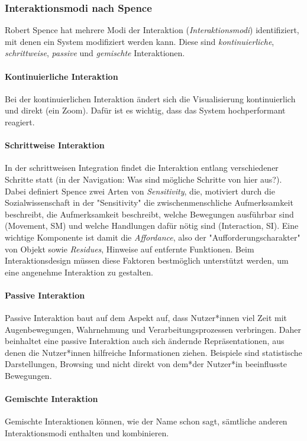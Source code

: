 			\subsubsection{Interaktionsmodi nach Spence}
				Robert Spence hat mehrere Modi der Interaktion (\emph{Interaktionsmodi}) identifiziert, mit denen ein System modifiziert werden kann. Diese sind \emph{kontinuierliche}, \emph{schrittweise}, \emph{passive} und \emph{gemischte} Interaktionen.

				\paragraph{Kontinuierliche Interaktion}
					Bei der kontinuierlichen Interaktion ändert sich die Visualisierung kontinuierlich und direkt (\bspw ein Zoom). Dafür ist es wichtig, dass das System hochperformant reagiert.

				\paragraph{Schrittweise Interaktion}
					In der schrittweisen Integration findet die Interaktion entlang verschiedener Schritte statt (\zB in der Navigation: Was sind mögliche Schritte von hier aus?). Dabei definiert Spence zwei Arten von \emph{Sensitivity}, die, motiviert durch die Sozialwissenschaft in der "Sensitivity" die zwischenmenschliche Aufmerksamkeit beschreibt, die Aufmerksamkeit beschreibt, welche Bewegungen ausführbar sind (Movement, SM) und welche Handlungen dafür nötig sind (Interaction, SI). Eine wichtige Komponente ist damit die \emph{Affordance}, also der "Aufforderungscharakter" von Objekt sowie \emph{Residues}, Hinweise auf entfernte Funktionen. Beim Interaktionsdesign müssen diese Faktoren bestmöglich unterstützt werden, um eine angenehme Interaktion zu gestalten.

				\paragraph{Passive Interaktion}
					Passive Interaktion baut auf dem Aspekt auf, dass Nutzer*innen viel Zeit mit Augenbewegungen, Wahrnehmung und Verarbeitungsprozessen verbringen. Daher beinhaltet eine passive Interaktion auch sich ändernde Repräsentationen, aus denen die Nutzer*innen hilfreiche Informationen ziehen. Beispiele sind statistische Darstellungen, Browsing und nicht direkt von dem*der Nutzer*in beeinflusste Bewegungen.

				\paragraph{Gemischte Interaktion}
					Gemischte Interaktionen können, wie der Name schon sagt, sämtliche anderen Interaktionsmodi enthalten und kombinieren.

